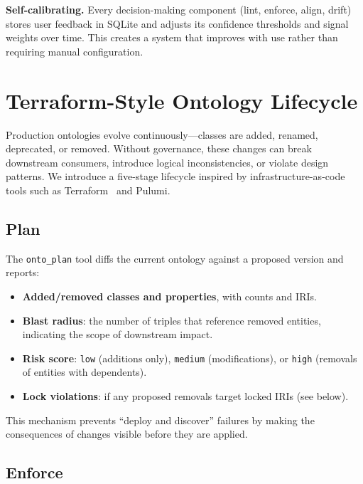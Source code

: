 \documentclass[runningheads]{llncs}
\begin{document}
\textbf{Self-calibrating.} Every decision-making component (lint, enforce, align, drift) stores user feedback in SQLite and adjusts its confidence thresholds and signal weights over time. This creates a system that improves with use rather than requiring manual configuration.


\section{Terraform-Style Ontology Lifecycle}
\label{sec:lifecycle}

Production ontologies evolve continuously—classes are added, renamed, deprecated, or removed. Without governance, these changes can break downstream consumers, introduce logical inconsistencies, or violate design patterns. We introduce a five-stage lifecycle inspired by infrastructure-as-code tools such as Terraform~\cite{terraform} and Pulumi.

\subsection{Plan}
\label{sec:plan}

The \texttt{onto\_plan} tool diffs the current ontology against a proposed version and reports:

\begin{itemize}
    \item \textbf{Added/removed classes and properties}, with counts and IRIs.
    \item \textbf{Blast radius}: the number of triples that reference removed entities, indicating the scope of downstream impact.
    \item \textbf{Risk score}: \texttt{low} (additions only), \texttt{medium} (modifications), or \texttt{high} (removals of entities with dependents).
    \item \textbf{Lock violations}: if any proposed removals target locked IRIs (see below).
\end{itemize}

This mechanism prevents ``deploy and discover'' failures by making the consequences of changes visible before they are applied.

\subsection{Enforce}
\label{sec:enforce}
\end{document}
